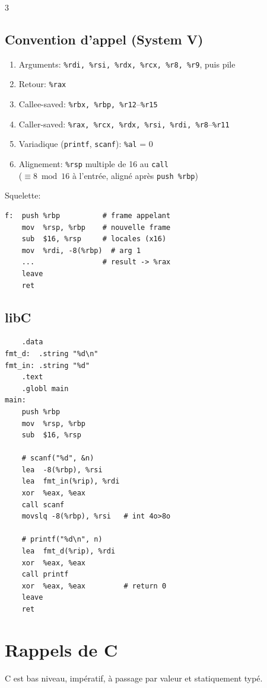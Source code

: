 \documentclass[12pt, a4paper]{article}
\begin{document}
\begin{multicols*}{3}
	\subsection{Convention d'appel (System V)}
	\begin{enumerate}[\roman*.]
		\item Arguments: \lstinline|%rdi, %rsi, %rdx, %rcx, %r8, %r9|, puis pile
		\item Retour: \lstinline|%rax|
		\item Callee-saved: \lstinline|%rbx, %rbp, %r12|--\lstinline|%r15|
		\item Caller-saved: \lstinline|%rax, %rcx, %rdx, %rsi, %rdi, %r8|--\lstinline|%r11|
		\item Variadique (\lstinline|printf|, \lstinline|scanf|): \lstinline|%al| = 0
		\item Alignement: \lstinline|%rsp| multiple de 16 au \lstinline|call|\\($\equiv 8 \bmod 16$ à l'entrée, aligné après \lstinline|push %rbp|)
	\end{enumerate}

	\colbreak
	Squelette:
	\noindent\begin{minipage}{\linewidth}
		\begin{lstlisting}
f:  push %rbp          # frame appelant
    mov  %rsp, %rbp    # nouvelle frame
    sub  $16, %rsp     # locales (x16)
    mov  %rdi, -8(%rbp)  # arg 1
    ...                # result -> %rax
    leave
    ret
\end{lstlisting}
	\end{minipage}

	\subsection{libC}
	\begin{lstlisting}
    .data
fmt_d:  .string "%d\n"
fmt_in: .string "%d"
    .text
    .globl main
main:
    push %rbp
    mov  %rsp, %rbp
    sub  $16, %rsp

    # scanf("%d", &n)
    lea  -8(%rbp), %rsi 
    lea  fmt_in(%rip), %rdi
    xor  %eax, %eax
    call scanf
    movslq -8(%rbp), %rsi   # int 4o>8o

    # printf("%d\n", n)
    lea  fmt_d(%rip), %rdi  
    xor  %eax, %eax
    call printf
    xor  %eax, %eax         # return 0
    leave
    ret
\end{lstlisting}
	\colbreak

	\section{Rappels de C}
	C est bas niveau, impératif, à passage par valeur et statiquement typé.


\end{multicols*}
\end{document}
